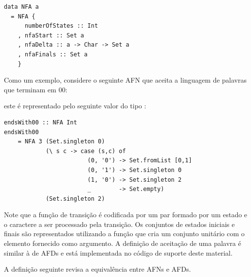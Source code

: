 \begin{verbatim}
data NFA a
  = NFA {
      numberOfStates :: Int
    , nfaStart :: Set a
    , nfaDelta :: a -> Char -> Set a
    , nfaFinals :: Set a
    }
\end{verbatim}

Como um exemplo, considere o seguinte AFN que aceita a linguagem de
palavras que terminam em 00:
\begin{figure}[H]
  \centering
\end{figure}

este é representado pelo seguinte valor do tipo :

\begin{verbatim}
endsWith00 :: NFA Int
endsWith00
    = NFA 3 (Set.singleton 0)
            (\ s c -> case (s,c) of
                        (0, '0') -> Set.fromList [0,1]
                        (0, '1') -> Set.singleton 0
                        (1, '0') -> Set.singleton 2
                        _        -> Set.empty)
            (Set.singleton 2)
\end{verbatim}

Note que a função de transição é codificada por um par formado por um
estado e o caractere a ser processado pela transição. Os conjuntos de
estados iniciais e finais são representados utilizando a função
 que cria um conjunto unitário
com o elemento fornecido como argumento. A definição de aceitação de
uma palavra é similar à de AFDs e está implementada no código de
suporte deste material.

A definição seguinte revisa a equivalência entre AFNs e AFDs.


